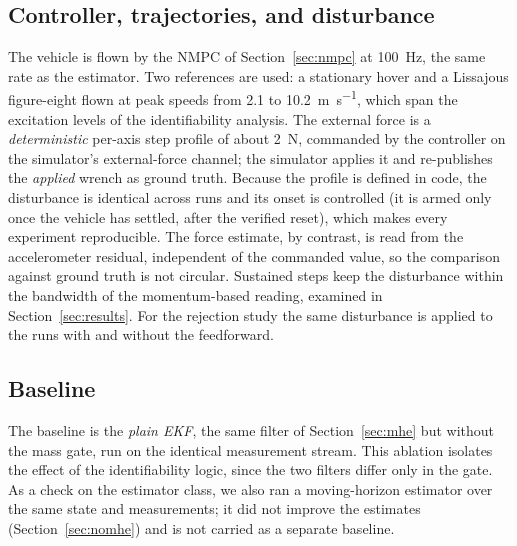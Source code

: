 \documentclass{ieeeaccess}
\begin{document}
\subsection{Controller, trajectories, and disturbance}
The vehicle is flown by the NMPC of Section~\ref{sec:nmpc} at \SI{100}{\hertz},
the same rate as the estimator. Two references are used: a
stationary hover and a Lissajous figure-eight flown at peak speeds from
\SI{2.1}{} to \SI{10.2}{\meter\per\second}, which span the excitation levels of
the identifiability analysis. The external force is a \emph{deterministic} per-axis
step profile of about \SI{2}{\newton}, commanded by the controller on the
simulator's external-force channel; the simulator applies it and re-publishes the
\emph{applied} wrench as ground truth. Because the profile is defined in code, the
disturbance is identical across runs and its onset is controlled (it is armed only
once the vehicle has settled, after the verified reset), which makes every
experiment reproducible. The force estimate, by contrast, is read from the
accelerometer residual, independent of the commanded value, so the comparison
against ground truth is not circular. Sustained steps keep the disturbance within
the bandwidth of the momentum-based reading, examined in
Section~\ref{sec:results}. For the rejection study the same disturbance is applied
to the runs with and without the feedforward.

\subsection{Baseline}
The baseline is the \emph{plain EKF}, the same filter of Section~\ref{sec:mhe}
but without the mass gate, run on the identical measurement stream. This
ablation isolates the effect of the identifiability logic, since the two filters
differ only in the gate. As a check on the estimator class, we also ran a
moving-horizon estimator over the same state and measurements; it did not improve
the estimates (Section~\ref{sec:nomhe}) and is not carried as a separate
baseline.
\end{document}
